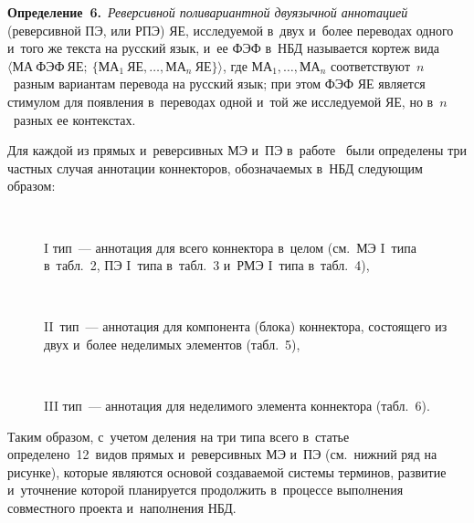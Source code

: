 \begin{multicols}{2}
   \noindent
   \textbf{Определение~6.}\ \textit{Реверсивной поливариантной двуязычной 
аннотацией} (реверсивной ПЭ, или РПЭ) ЯЕ, 
исследуемой в~двух и~более переводах одного и~того же текста на русский язык, 
и~ее ФЭФ в~НБД называется кортеж вида $\langle\mathrm{МА\ ФЭФ\ ЯЕ};\ 
\{\mathrm{МА}_1\ \mathrm{ЯЕ}, \ldots, \mathrm{МА}_n\ \mathrm{ЯЕ}\}\rangle$, 
где $\mathrm{МА}_1,\ldots, \mathrm{МА}_n$ соответствуют~$n$~разным 
вариантам перевода на русский язык; при этом ФЭФ ЯЕ является стимулом для 
появления в~переводах одной и~той же исследуемой ЯЕ, но в~$n$~разных ее 
контекстах.
   
   \smallskip
   
   Для каждой из прямых и~реверсивных МЭ и~ПЭ в~работе~\cite{10-zat} были 
определены три частных случая аннотации коннекторов, обозначаемых в~НБД 
следующим образом:
   \begin{description}
\item[\,] I тип~--- аннотация для всего коннектора в~целом (см.\ МЭ 
I~типа в~табл.~2, ПЭ I~типа в~табл.~3 и~РМЭ I~типа в~табл.~4),
\item[\,] II~тип~--- аннотация для компонента (блока) коннектора, 
состоящего из двух и~более неделимых элементов (табл.~5),
\item[\,] III тип~--- аннотация для неделимого элемента коннектора 
(табл.~6).
\end{description}

   Таким образом, с~учетом деления на три типа всего в~статье 
определено~12~видов прямых и~реверсивных МЭ и~ПЭ (см.\ нижний ряд на 
рисунке), которые являются основой создаваемой системы терминов, развитие 
и~уточнение которой планируется продолжить в~процессе выполнения 
совместного проекта и~наполнения НБД.

 

 

\pagebreak

\end{multicols}
   
